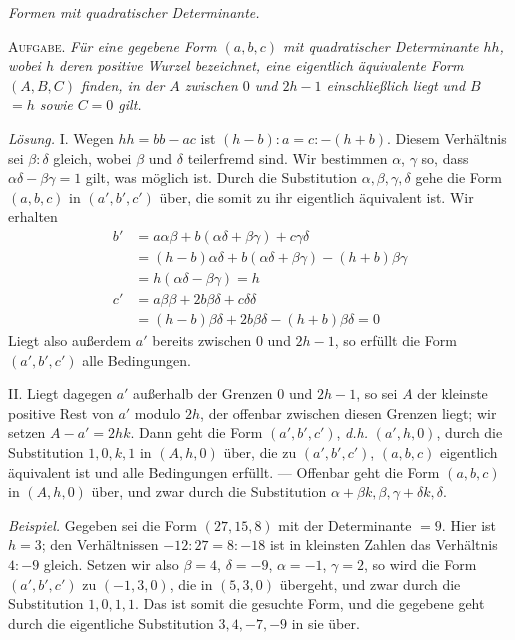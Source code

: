 \begin{center}
\textit{Formen mit quadratischer Determinante.}
\end{center}

\textsc{Aufgabe.} \textit{Für eine gegebene Form $(a,b,c)$ mit quadratischer Determinante $hh$, wobei $h$ deren positive Wurzel bezeichnet, eine eigentlich äquivalente Form $(A,B,C)$ finden, in der $A$ zwischen $0$ und $2h-1$ einschließlich liegt und $B$ $=h$ sowie $C=0$ gilt.}

\textit{Lösung.} I. Wegen $hh=bb-ac$ ist $(h-b):a=c:-(h+b)$. Diesem Verhältnis sei $\beta:\delta$ gleich, wobei $\beta$ und $\delta$ teilerfremd sind. Wir bestimmen $\alpha$, $\gamma$ so, dass $\alpha\delta-\beta\gamma=1$ gilt, was möglich ist. Durch die Substitution $\alpha,\beta,\gamma,\delta$ gehe die Form $(a,b,c)$ in $(a',b',c')$ über, die somit zu ihr eigentlich äquivalent ist. Wir erhalten
\[
\begin{aligned}
b'&=a\alpha\beta+b(\alpha\delta+\beta\gamma)+c\gamma\delta\\
&=(h-b)\alpha\delta+b(\alpha\delta+\beta\gamma)-(h+b)\beta\gamma\\
&=h(\alpha\delta-\beta\gamma)=h\\
c'&=a\beta\beta+2b\beta\delta+c\delta\delta\\
&=(h-b)\beta\delta+2b\beta\delta-(h+b)\beta\delta=0
\end{aligned}
\]
Liegt also außerdem $a'$ bereits zwischen $0$ und $2h-1$, so erfüllt die Form $(a',b',c')$ alle Bedingungen.

II. Liegt dagegen $a'$ außerhalb der Grenzen $0$ und $2h-1$, so sei $A$ der kleinste positive Rest von $a'$ modulo $2h$, der offenbar zwischen diesen Grenzen liegt; wir setzen $A-a'=2hk$. Dann geht die Form $(a',b',c')$, \textit{d.h.} $(a',h,0)$, durch die Substitution $1,0,k,1$ in $(A,h,0)$ über, die zu $(a',b',c')$, $(a,b,c)$ eigentlich äquivalent ist und alle Bedingungen erfüllt. --- Offenbar geht die Form $(a,b,c)$ in $(A,h,0)$ über, und zwar durch die Substitution $\alpha+\beta k,\beta,\gamma+\delta k,\delta$.

\textit{Beispiel.} Gegeben sei die Form $(27,15,8)$ mit der Determinante $=9$. Hier ist $h=3$; den Verhältnissen $-12:27=8:-18$ ist in kleinsten Zahlen das Verhältnis $4:-9$ gleich. Setzen wir also $\beta=4$, $\delta=-9$, $\alpha=-1$, $\gamma=2$, so wird die Form $(a',b',c')$ zu $(-1,3,0)$, die in $(5,3,0)$ übergeht, und zwar durch die Substitution $1,0,1,1$. Das ist somit
die gesuchte Form, und die gegebene geht durch die eigentliche Substitution $3,4,-7,-9$ in sie über.

